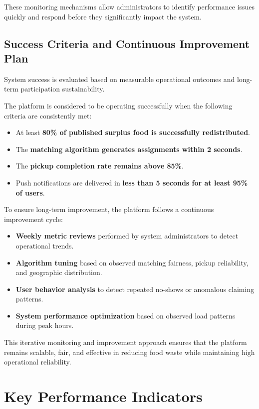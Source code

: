 \documentclass[12pt]{article}
\begin{document}
These monitoring mechanisms allow administrators to identify performance issues quickly and respond before they significantly impact the system.

\subsection{Success Criteria and Continuous Improvement Plan}

System success is evaluated based on measurable operational outcomes and long-term participation sustainability.

The platform is considered to be operating successfully when the following criteria are consistently met:

\begin{itemize}
    \item At least \textbf{80\% of published surplus food is successfully redistributed}.
    \item The \textbf{matching algorithm generates assignments within 2 seconds}.
    \item The \textbf{pickup completion rate remains above 85\%}.
    \item Push notifications are delivered in \textbf{less than 5 seconds for at least 95\% of users}.
\end{itemize}

To ensure long-term improvement, the platform follows a continuous improvement cycle:

\begin{itemize}
    \item \textbf{Weekly metric reviews} performed by system administrators to detect operational trends.
    \item \textbf{Algorithm tuning} based on observed matching fairness, pickup reliability, and geographic distribution.
    \item \textbf{User behavior analysis} to detect repeated no-shows or anomalous claiming patterns.
    \item \textbf{System performance optimization} based on observed load patterns during peak hours.
\end{itemize}

This iterative monitoring and improvement approach ensures that the platform remains scalable, fair, and effective in reducing food waste while maintaining high operational reliability.

\appendix

\section{Key Performance Indicators}
\label{app:kpis}
\end{document}
